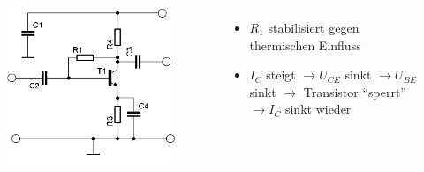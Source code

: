 \begin{frame}
\begin{columns}
\begin{center}
\begin{figure}
      \end{figure}
    \end{center}
  \end{columns}
\end{frame}

\begin{frame}
  \begin{columns}
    \begin{center}
      \begin{figure}
        \includegraphics[width=\textwidth,height=.85\textheight,keepaspectratio]{a06/Transistor-Verstaerker-APstab2a.png}
      \end{figure}
    \end{center}
    \begin{itemize}
      \item $R_1$ stabilisiert gegen thermischen Einfluss
      \item $I_C$ steigt $\rightarrow U_{CE}$ sinkt $\rightarrow U_{BE}$ sinkt
        $\rightarrow$ Transistor ``sperrt'' $\rightarrow I_C$ sinkt wieder
    \end{itemize}
  \end{columns}
\end{frame}

